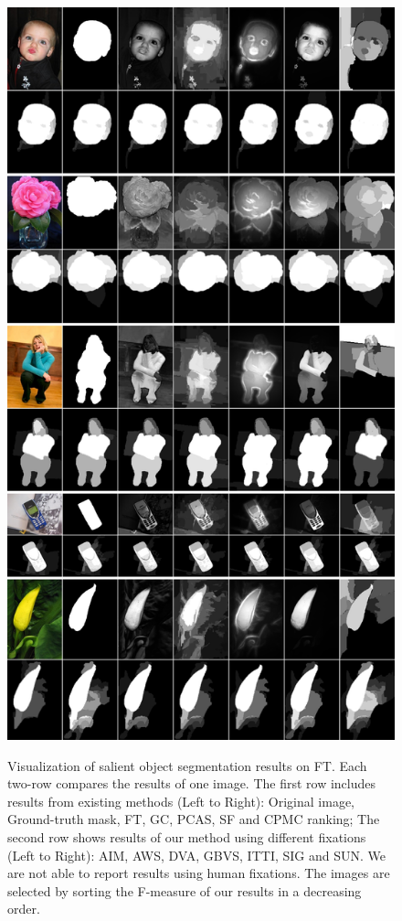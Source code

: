 \begin{figure}[p]
\centering
\includegraphics[width=0.65\linewidth]{ft_final.jpg}\\
\caption{Visualization of salient object segmentation results on FT. Each two-row compares the results of one image.  The first row includes results from existing methods (Left to Right): Original image, Ground-truth mask, FT, GC, PCAS, SF and CPMC ranking; The second row shows results of our method using different fixations (Left to Right): AIM, AWS, DVA, GBVS, ITTI, SIG and SUN. We are not able to report results using human fixations. The images are selected by sorting the F-measure of our results in a decreasing order. }\label{fig:ftRes}
\end{figure}


